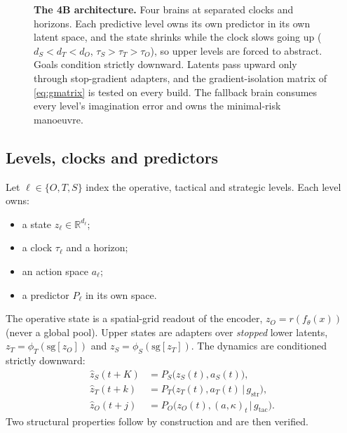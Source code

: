 \documentclass[10pt,twocolumn]{article}
\theoremstyle{remark}
\newcommand{\Rset}{\mathbb{R}}
\begin{document}
\begin{figure}[t]
{}
\caption{\textbf{The 4B architecture.} Four brains at separated clocks and horizons. Each predictive level owns its own predictor in
its own latent space, and the state shrinks while the clock slows going up ($d_S<d_T<d_O$, $\tau_S>\tau_T>\tau_O$), so upper levels
are forced to abstract. Goals condition strictly downward. Latents pass upward only through stop-gradient adapters, and the
gradient-isolation matrix of \cref{eq:gmatrix} is tested on every build. The fallback brain consumes every level's imagination error
and owns the minimal-risk manoeuvre.}
\label{fig:4b}
\end{figure}

\subsection{Levels, clocks and predictors}
Let $\ell\in\{O,T,S\}$ index the operative, tactical and strategic levels. Each level owns:
\begin{itemize}
  \item a state $z_\ell\in\Rset^{d_\ell}$;
  \item a clock $\tau_\ell$ and a horizon;
  \item an action space $a_\ell$;
  \item a predictor $P_\ell$ in its own space.
\end{itemize}
The operative state is a spatial-grid readout of the encoder, $z_O=r(f_\theta(x))$ (never a global pool). Upper states are adapters over
\emph{stopped} lower latents, $z_T=\phi_T(\mathrm{sg}[z_O])$ and $z_S=\phi_S(\mathrm{sg}[z_T])$. The dynamics are conditioned strictly
downward:
\begin{equation}
\begin{aligned}
\hat z_S(t{+}K) &= P_S\big(z_S(t),a_S(t)\big),\\
\hat z_T(t{+}k) &= P_T\big(z_T(t),a_T(t)\,\big|\,g_{\mathrm{str}}\big),\\
\hat z_O(t{+}j) &= P_O\big(z_O(t),(a,\kappa)_t\,\big|\,g_{\mathrm{tac}}\big).
\end{aligned}
\end{equation}
Two structural properties follow by construction and are then verified.
\end{document}
